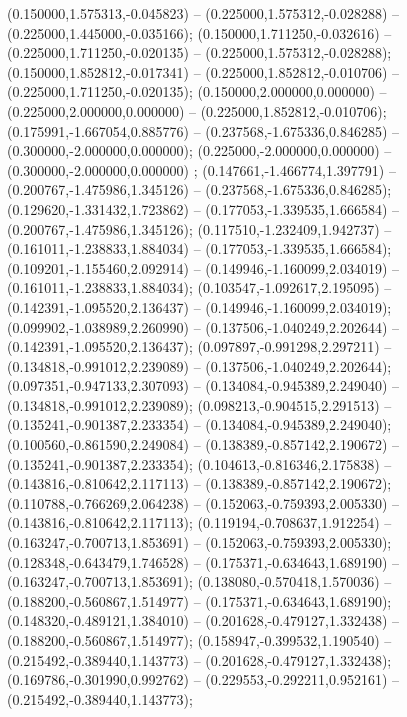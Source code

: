  (0.150000,1.575313,-0.045823) -- (0.225000,1.575312,-0.028288) -- (0.225000,1.445000,-0.035166);
 (0.150000,1.711250,-0.032616) -- (0.225000,1.711250,-0.020135) -- (0.225000,1.575312,-0.028288);
 (0.150000,1.852812,-0.017341) -- (0.225000,1.852812,-0.010706) -- (0.225000,1.711250,-0.020135);
 (0.150000,2.000000,0.000000) -- (0.225000,2.000000,0.000000) -- (0.225000,1.852812,-0.010706);
 (0.175991,-1.667054,0.885776) -- (0.237568,-1.675336,0.846285) -- (0.300000,-2.000000,0.000000);
 (0.225000,-2.000000,0.000000) -- (0.300000,-2.000000,0.000000) ;
 (0.147661,-1.466774,1.397791) -- (0.200767,-1.475986,1.345126) -- (0.237568,-1.675336,0.846285);
 (0.129620,-1.331432,1.723862) -- (0.177053,-1.339535,1.666584) -- (0.200767,-1.475986,1.345126);
 (0.117510,-1.232409,1.942737) -- (0.161011,-1.238833,1.884034) -- (0.177053,-1.339535,1.666584);
 (0.109201,-1.155460,2.092914) -- (0.149946,-1.160099,2.034019) -- (0.161011,-1.238833,1.884034);
 (0.103547,-1.092617,2.195095) -- (0.142391,-1.095520,2.136437) -- (0.149946,-1.160099,2.034019);
 (0.099902,-1.038989,2.260990) -- (0.137506,-1.040249,2.202644) -- (0.142391,-1.095520,2.136437);
 (0.097897,-0.991298,2.297211) -- (0.134818,-0.991012,2.239089) -- (0.137506,-1.040249,2.202644);
 (0.097351,-0.947133,2.307093) -- (0.134084,-0.945389,2.249040) -- (0.134818,-0.991012,2.239089);
 (0.098213,-0.904515,2.291513) -- (0.135241,-0.901387,2.233354) -- (0.134084,-0.945389,2.249040);
 (0.100560,-0.861590,2.249084) -- (0.138389,-0.857142,2.190672) -- (0.135241,-0.901387,2.233354);
 (0.104613,-0.816346,2.175838) -- (0.143816,-0.810642,2.117113) -- (0.138389,-0.857142,2.190672);
 (0.110788,-0.766269,2.064238) -- (0.152063,-0.759393,2.005330) -- (0.143816,-0.810642,2.117113);
 (0.119194,-0.708637,1.912254) -- (0.163247,-0.700713,1.853691) -- (0.152063,-0.759393,2.005330);
 (0.128348,-0.643479,1.746528) -- (0.175371,-0.634643,1.689190) -- (0.163247,-0.700713,1.853691);
 (0.138080,-0.570418,1.570036) -- (0.188200,-0.560867,1.514977) -- (0.175371,-0.634643,1.689190);
 (0.148320,-0.489121,1.384010) -- (0.201628,-0.479127,1.332438) -- (0.188200,-0.560867,1.514977);
 (0.158947,-0.399532,1.190540) -- (0.215492,-0.389440,1.143773) -- (0.201628,-0.479127,1.332438);
 (0.169786,-0.301990,0.992762) -- (0.229553,-0.292211,0.952161) -- (0.215492,-0.389440,1.143773);
